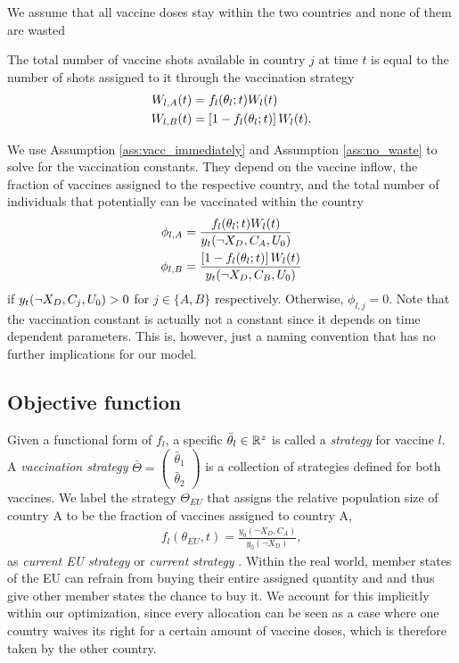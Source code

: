 We assume that all vaccine doses stay within the two countries and none of them are wasted
\begin{assumption}
\label{ass:no_waste}
The total number of vaccine shots available in country $j$ at time $t$ is equal to the number of shots assigned to it through the vaccination strategy
\begin{align}
\label{eq:vaccine_frac}
W_{l,A}(t) &= f_{l}(\theta_l; t) W_l(t) \\
W_{l,B}(t) &= \left[1 - f_{l}(\theta_l; t)\right] W_l(t) \notag.
\end{align}
\end{assumption}
\noindent We use Assumption \ref{ass:vacc_immediately} and Assumption \ref{ass:no_waste} to solve for the vaccination constants. They depend on the vaccine inflow, the fraction of vaccines assigned to the respective country, and the total number of individuals that potentially can be vaccinated within the country
\begin{align*}
\phi_{l,A} &= \frac{ f_{l}(\theta_l; t) W_{l}(t)}{y_t(\neg X_D, C_A, U_0) } \notag \\
\phi_{l,B} &= \frac{\left[1 - f_{l}(\theta_l; t)\right]  W_{l}(t)}{y_t(\neg X_D, C_B, U_0)}
\end{align*}
if $y_t(\neg X_D, C_j, U_0) > 0$ for $j \in \{A,B\}$ respectively. Otherwise, $\phi_{l,j} = 0$. Note that the vaccination constant is actually not a constant since it depends on time dependent parameters. This is, however, just a naming convention that has no further implications for our model.

\subsection{Objective function}
Given a functional form of $f_{l}$, a specific $\bar{\theta}_l \in  \mathbb{R}^z$ is called a \textit{strategy} for vaccine $l$. A \textit{vaccination strategy} $\bar \Theta = \begin{pmatrix}
\bar \theta_1 \\ \bar \theta_2
\end{pmatrix}$ is a collection of strategies defined for both vaccines. We label the strategy $\Theta_{EU}$ that assigns the relative population size of country A to be the fraction of vaccines assigned to country A,
\begin{align}
f_l(\theta_{EU}, t) = \frac{y_0(\neg X_D, C_A)}{y_0(\neg X_D)},
\end{align}
as \textit{current EU strategy} or \textit{current strategy} \citep{ec.2021}. Within the real world, member states of the EU can refrain from buying their entire assigned quantity and and thus give other member states the chance to buy it. We account for this implicitly within our optimization, since every allocation can be seen as a case where one country waives its right for a certain amount of vaccine doses, which is therefore taken by the other country. \\ %

